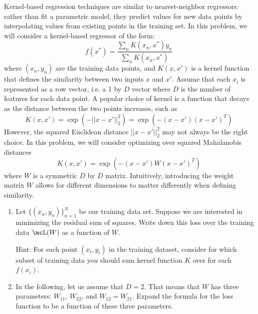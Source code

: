 \documentclass[submit]{harvardml}
\begin{document}
\begin{problem}

Kernel-based regression techniques are similar to nearest-neighbor
regressors: rather than fit a parametric model, they predict values
for new data points by interpolating values from existing points in
the training set.  In this problem, we will consider a kernel-based
regressor of the form:
\begin{equation*}
  f(x^*) = \frac{ \sum_{n} K(x_n,x^*) y_n  }{ \sum_{n} K(x_n,x^*) } 
\end{equation*}
where $(x_n,y_n)$ are the training data points, and $K(x,x')$ is a
kernel function that defines the similarity between two inputs $x$ and
$x'$. Assume that each $x_i$ is represented as a row vector, i.e. a
1 by $D$ vector where $D$ is the number of features for each data point. A popular choice of 
kernel is a function that decays as the distance between the two points increases, such as
\begin{equation*}
  K(x,x') = \exp(-||x-x'||^2_2) = \exp(-(x-x') (x-x')^T ) 
\end{equation*} 
However, the squared Euclidean distance $||x-x'||^2_2$ may not always
be the right choice.  In this problem, we will consider optimizing
over squared Mahalanobis distances
\begin{equation*}
  K(x,x') = \exp(-(x-x') W (x-x')^T ) 
  \label{eqn:distance}
\end{equation*} 
where $W$ is a symmetric $D$ by $D$ matrix.  Intuitively, introducing
the weight matrix $W$ allows for different dimensions to matter
differently when defining similarity.

\begin{enumerate}

\item Let $\{(x_n,y_n)\}_{n=1}^N$ be our training data set.  Suppose
  we are interested in minimizing the residual sum of squares.  Write down this
  loss over the training data $\mcL(W)$ as a function of $W$.
  
  Hint:  For each point $(x_i, y_i)$ in the training dataset, consider for which subset of training data you should sum kernel function $K$ over for each $f(x_i)$.

\item In the following, let us assume that $D = 2$.  That means that
  $W$ has three parameters: $W_{11}$, $W_{22}$, and $W_{12} = W_{21}$.
  Expand the formula for the loss function to be a function of these
  three parameters.


\end{enumerate}
\end{problem}
\end{document}
